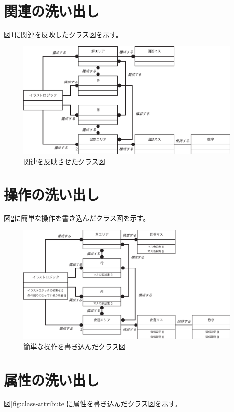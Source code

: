 \documentclass[a4j]{jarticle}
\begin{document}
\section{関連の洗い出し}
図\ref{fig:class-relation}に関連を反映したクラス図を示す。

\begin{figure}[hp]
\centering
\includegraphics[width=15cm]{./image/class-relation.eps}
\caption{関連を反映させたクラス図}
\label{fig:class-relation}
\end{figure}

\section{操作の洗い出し}
図\ref{fig:class-method}に簡単な操作を書き込んだクラス図を示す。

\begin{figure}[hp]
\centering
\includegraphics[width=15cm]{./image/class-method.eps}
\caption{簡単な操作を書き込んだクラス図}
\label{fig:class-method}
\end{figure}

\section{属性の洗い出し}
図\ref{fig:class-attribute}に属性を書き込んだクラス図を示す。
\end{document}
